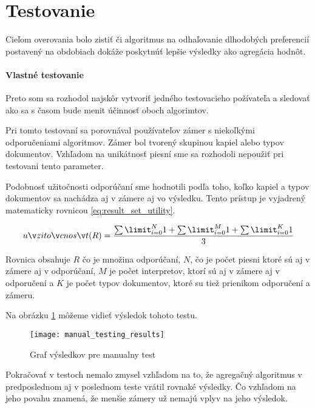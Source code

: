 ﻿\newpage

\section{Testovanie}

Cieľom overovania bolo zistiť či algoritmus na odhaľovanie dlhodobých 
preferencií postavený na obdobiach dokáže poskytnúť lepšie výsledky ako 
agregácia hodnôt.

\paragraph{Vlastné testovanie}

Preto som sa rozhodol najskôr vytvoriť jedného testovacieho požívateľa a sledovať 
ako sa s časom bude menit účinnosť oboch algorimtov. 

Pri tomto testovaní sa porovnával používateľov zámer s niekoľkými odporučeniami algoritmov.
Zámer bol tvorený skupinou kapiel alebo typov dokumentov. Vzhľadom na unikátnosť piesní
sme sa rozhodoli nepoužiť pri testovani tento parameter.

Podobnosť užitočnosti odporúčaní sme hodnotili podľa toho, koľko kapiel a typov dokumentov
sa nachádza aj v zámere aj vo výsledku. Tento prístup je vyjadrený matematicky 
rovnicou \ref{eq:result_set_utility}.

\begin{equation}\label{eq:result_set_utility}
užitočnosť(R) = \frac{\sum\limit_{i=0}^{N}1 + \sum\limit_{i=0}^{M} 1 +\sum\limit_{i=0}^{K}1}{3}
\end{equation}

Rovnica obsahuje \(R\) čo je množina odporúčaní, \(N\), čo je počet piesni ktoré sú aj v
zámere aj v odporúčaní, \(M\) je počet interpretov, ktorí sú aj v zámere aj v odporučení a 
\(K\) je počet typov dokumentov, ktoré su tiež prienikom odporučení a zámeru.

Na obrázku \ref{fig:manual_testing_results} môžeme vidieť výsledok tohoto testu.

\begin{figure}
    \begin{center}
        \texttt{[image: manual\_testing\_results]}
        \caption{Graf výsledkov pre manualny test}
        \label{fig:manual_testing_results}
    \end{center}
\end{figure}

Pokračovať v testoch nemalo zmysel vzhľadom na to, že agregačný algoritmus v predposlednom
aj v poslednom teste vrátil rovnaké výsledky. Čo vzhľadom na jeho povahu znamená, že 
menšie zámery už nemajú vplyv na jeho výsledok.

